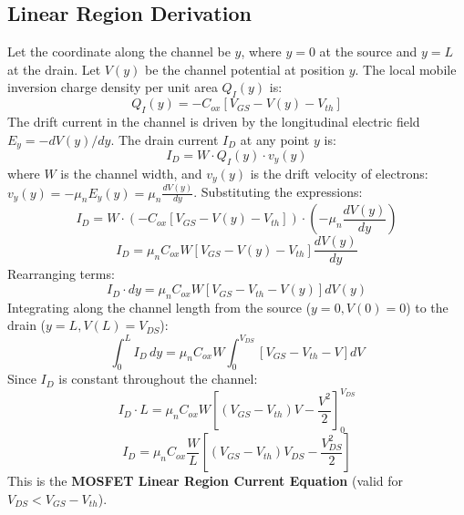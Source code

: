 \documentclass[12pt,a4paper]{article}
\begin{document}
\subsection{Linear Region Derivation}
Let the coordinate along the channel be $y$, where $y = 0$ at the source and $y = L$ at the drain. Let $V(y)$ be the channel potential at position $y$.
The local mobile inversion charge density per unit area $Q_I(y)$ is:
\begin{equation}
  Q_I(y) = -C_{ox} \left[ V_{GS} - V(y) - V_{th} \right]
\end{equation}
The drift current in the channel is driven by the longitudinal electric field $E_y = -dV(y)/dy$. The drain current $I_D$ at any point $y$ is:
\begin{equation}
  I_D = W \cdot Q_I(y) \cdot v_y(y)
\end{equation}
where $W$ is the channel width, and $v_y(y)$ is the drift velocity of electrons: $v_y(y) = -\mu_n E_y(y) = \mu_n \frac{dV(y)}{dy}$.
Substituting the expressions:
\begin{equation}
  I_D = W \cdot \left( -C_{ox} \left[ V_{GS} - V(y) - V_{th} \right] \right) \cdot \left( -\mu_n \frac{dV(y)}{dy} \right)
\end{equation}
\begin{equation}
  I_D = \mu_n C_{ox} W \left[ V_{GS} - V(y) - V_{th} \right] \frac{dV(y)}{dy}
\end{equation}
Rearranging terms:
\begin{equation}
  I_D \cdot dy = \mu_n C_{ox} W \left[ V_{GS} - V_{th} - V(y) \right] dV(y)
\end{equation}
Integrating along the channel length from the source ($y=0, V(0)=0$) to the drain ($y=L, V(L)=V_{DS}$):
\begin{equation}
  \int_{0}^{L} I_D \, dy = \mu_n C_{ox} W \int_{0}^{V_{DS}} \left[ V_{GS} - V_{th} - V \right] dV
\end{equation}
Since $I_D$ is constant throughout the channel:
\begin{equation}
  I_D \cdot L = \mu_n C_{ox} W \left[ (V_{GS} - V_{th})V - \frac{V^2}{2} \right]_{0}^{V_{DS}}
\end{equation}
\begin{equation}
  I_D = \mu_n C_{ox} \frac{W}{L} \left[ (V_{GS} - V_{th})V_{DS} - \frac{V_{DS}^2}{2} \right]
\end{equation}
This is the \textbf{MOSFET Linear Region Current Equation} (valid for $V_{DS} < V_{GS} - V_{th}$).
\end{document}
